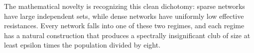 The mathematical novelty is recognizing this clean dichotomy: sparse networks have large independent sets, while dense networks have uniformly low effective resistances. Every network falls into one of these two regimes, and each regime has a natural construction that produces a spectrally insignificant club of size at least epsilon times the population divided by eight.
